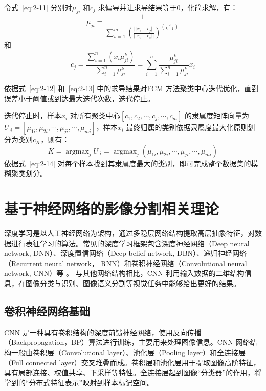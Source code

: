 令式~\ref{eq:2-11} 分别对$\mu_{ji}$ 和$c_j$ 求偏导并让求导结果等于$0$，化简求解，有：
\begin{equation}
  \label{eq:2-12}
  \mu_{ji} = \frac{1}{\sum_{s=1}^m(\frac{||x_i-c_j||}{||x_i-c_s||})^{(\frac{2}{k-1})}}
\end{equation}
和
\begin{equation}
  \label{eq:2-13}
  c_j = \frac{\sum_{i=1}^n(x_i\mu_{ji}^k)}{\sum_{i=1}^n\mu_{ji}^k} = \sum_{i=1}^n \frac{\mu_{ji}^k}{\sum_{i=1}^n\mu_{ji}^k}x_i
\end{equation}

依据式~\ref{eq:2-12} 和~\ref{eq:2-13} 中的求导结果对FCM 方法聚类中心迭代优化，直到误差小于阈值或到达最大迭代次数，迭代停止。

迭代停止时，样本$x_i$ 对所有聚类中心$[c_1,c_2,\cdots,c_j,\cdots,c_m]$ 的隶属度矩阵向量为$U_{\cdot i} = [\mu_{1i},\mu_{2i},\cdots,\mu_{ji},\cdots,\mu_{mi}]$，样本$x_i$ 最终归属的类别依据隶属度最大化原则划分为类别$c_K$，则有：
\begin{equation}
  \label{eq:2-14}
  K = \mathop{\arg\max}_{j} U_{\cdot i} = \mathop{\arg\max}_{j} (\mu_{1i},\mu_{2i},\cdots,\mu_{ji},\cdots,\mu_{mi})
\end{equation}
依据式~\ref{eq:2-14} 对每个样本找到其隶属度最大的类别，即可完成整个数据集的模糊聚类划分。

\section{基于神经网络的影像分割相关理论}
\label{sec:chap02-2}
深度学习是以人工神经网络为架构，通过多隐层网络结构提取高层抽象特征，对数据进行表征学习的算法。常见的深度学习框架包含深度神经网络（Deep neural network, DNN）、深度置信网络（Deep belief network, DBN）、递归神经网络（Recurrent neural network， RNN）和卷积神经网络（Convolutional neural network, CNN）等\cite{krizhevsky2012imagenet} 。 与其他网络结构相比，CNN 利用输入数据的二维结构信息，在图像分类与识别、图像语义分割等视觉任务中能够给出更好的结果。


\subsection{卷积神经网络基础}
\label{subsec:chap02-2-1}
CNN 是一种具有卷积结构的深度前馈神经网络，使用反向传播（Backpropagation，BP）算法进行训练，主要用来处理图像信息。CNN 网络结构一般由卷积层（Convolutional layer）、池化层（Pooling layer）和全连接层（Full connected layer）交叉堆叠而成。卷积层和池化层用于提取图像高阶特征，具有局部连接、权值共享、下采样等特性。全连接层起到图像“分类器”的作用，将学到的“分布式特征表示”映射到样本标记空间。

